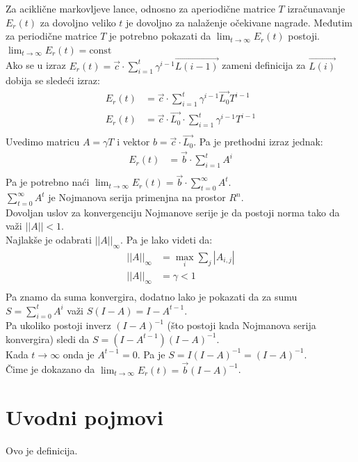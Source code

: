 \documentclass[a4paper,fleqn,12pt]{JMThesis}
\theoremstyle{plain}
\theoremstyle{definition}
\newcommand{\zbtg}{\sum_{t=0}^\infty}
\theoremstyle{definition}
\begin{document}
\medskip
Za aciklične markovljeve lance, odnosno za aperiodične matrice $T$ izračunavanje $E_r(t)$ za dovoljno veliko $t$ je dovoljno za nalaženje očekivane nagrade.
Međutim za periodične matrice $T$ je potrebno pokazati da $\lim_{t \to \infty}{E_r(t)}$ postoji.
\lem $\lim_{t \to \infty}{E_r(t)} = \text{const}$\\
Ako se u izraz $E_r(t) = \vec{c} \cdot \sum_{i=1}^{t}\gamma^{i-1}\vec{L(i-1)}$ zameni definicija za $\vec{L(i)}$ dobija se sledeći izraz:
\[
	\begin{split}
	E_r(t) &= \vec{c} \cdot \sum_{i=1}^{t}\gamma^{i-1}\vec{L_0}T^{i-1}\\
	E_r(t) &= \vec{c} \cdot \vec{L_0} \cdot \sum_{i=1}^{t}\gamma^{i-1}T^{i-1}\\
	\end{split}
\]
Uvedimo matricu $A = \gamma T$ i vektor $b = \vec{c}\cdot\vec{L_0}$. Pa je prethodni izraz jednak: \\
\[
	\begin{split}
	E_r(t) &= \vec{b} \cdot \sum_{i=1}^{t}A^i\\
	\end{split}
\]
Pa je potrebno naći $\lim_{t \to \infty}{E_r(t)} = \vec{b}\cdot \zbtg A^t$.\\
$\zbtg A^t$ je Nojmanova serija primenjna na prostor $R^n$.\\
Dovoljan uslov za konvergenciju Nojmanove serije je da postoji norma tako da važi $||A|| < 1$.\\
Najlakše je odabrati $||A||_{\infty}$. Pa je lako videti da:
\[
	\begin{split}
	||A||_{\infty} &= \max_{i}\sum_{j}|A_{i,j}|\\
	||A||_{\infty} &= \gamma < 1\\
	\end{split}
\]
Pa znamo da suma konvergira, dodatno lako je pokazati da za sumu $S = \sum_{i=0}^{t}A^i$ važi $S(I - A) = I - A^{t-1}$.\\
Pa ukoliko postoji inverz $(I - A)^{-1}$ (što postoji kada Nojmanova serija konvergira) sledi da $S=(I - A^{t-1})(I-A)^{-1}$.\\
Kada $t \to \infty$ onda je $A^{t-1} = 0$. Pa je $S = I(I-A)^{-1} = (I-A)^{-1}$.\\
Čime je dokazano da $\lim_{t \to \infty}{E_r(t)} = \vec{b}(I-A)^{-1}$.

\chapter[Uvodni pojmovi]{Uvodni pojmovi}
\bigskip
\de Ovo je definicija. 
\end{document}
